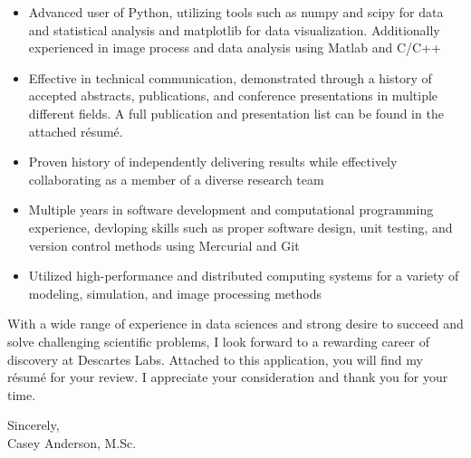 \begin{center}
\begin{minipage}{\textwidth}
\begin{itemize}[leftmargin=.45in,rightmargin=.45in,itemsep=1.6mm]
	\item Advanced user of Python, utilizing tools such as numpy and scipy for data and statistical analysis and matplotlib for data visualization. Additionally experienced in image process and data analysis using Matlab and C/C++

	\item Effective in technical communication, demonstrated through a history of accepted abstracts, publications, and conference presentations in multiple different fields. A full publication and presentation list can be found in the attached r\'{e}sum\'{e}.
	
	\item Proven history of independently delivering results while effectively collaborating as a member of a diverse research team

	\item Multiple years in software development and computational programming experience, devloping skills such as proper software design, unit testing, and version control methods using Mercurial and Git

	\item Utilized high-performance and distributed computing systems for a variety of modeling, simulation, and image processing methods
  \end{itemize} 

  \vspace{3mm}
  With a wide range of experience in data sciences and strong desire to succeed and solve challenging scientific problems, I look forward to a rewarding career of discovery at Descartes Labs.
  Attached to this application, you will find my r\'{e}sum\'{e} for your review. I appreciate your consideration and thank you for your time.
  
  \vspace{6mm}
  
  Sincerely, \\ 
  
  
  Casey Anderson, M.Sc.
  
  \end{minipage}
\end{center}

